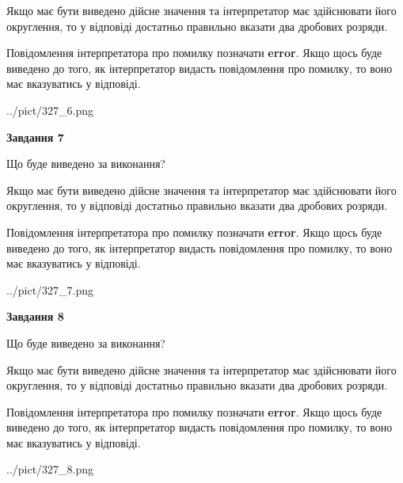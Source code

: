 \documentclass[12pt, ukrainian]{article}
\begin{document}
{\begin {Large}
Якщо має бути виведено дійсне значення та інтерпретатор має здійснювати його округлення, 
то у відповіді достатньо правильно вказати два дробових розряди.

Повідомлення інтерпретатора про помилку позначати \textbf{error}.
Якщо щось буде виведено до того, як інтерпретатор видасть повідомлення про помилку, 
то воно має вказуватись у відповіді. \par

\begin{center}
	{../pict/327_6.png}
\end{center}
\newpage

{\begin {center}\textbf{Завдання 7}\end {center}}\par
Що буде виведено за виконання? \par

Якщо має бути виведено дійсне значення та інтерпретатор має здійснювати його округлення, 
то у відповіді достатньо правильно вказати два дробових розряди.

Повідомлення інтерпретатора про помилку позначати \textbf{error}.
Якщо щось буде виведено до того, як інтерпретатор видасть повідомлення про помилку, 
то воно має вказуватись у відповіді. \par

\begin{center}
	{../pict/327_7.png}
\end{center}
\newpage

{\begin {center}\textbf{Завдання 8}\end {center}}\par
Що буде виведено за виконання? \par

Якщо має бути виведено дійсне значення та інтерпретатор має здійснювати його округлення, 
то у відповіді достатньо правильно вказати два дробових розряди.

Повідомлення інтерпретатора про помилку позначати \textbf{error}.
Якщо щось буде виведено до того, як інтерпретатор видасть повідомлення про помилку, 
то воно має вказуватись у відповіді. \par

\begin{center}
	{../pict/327_8.png}
\end{center}
\newpage


\end{Large}}
\end{document}
